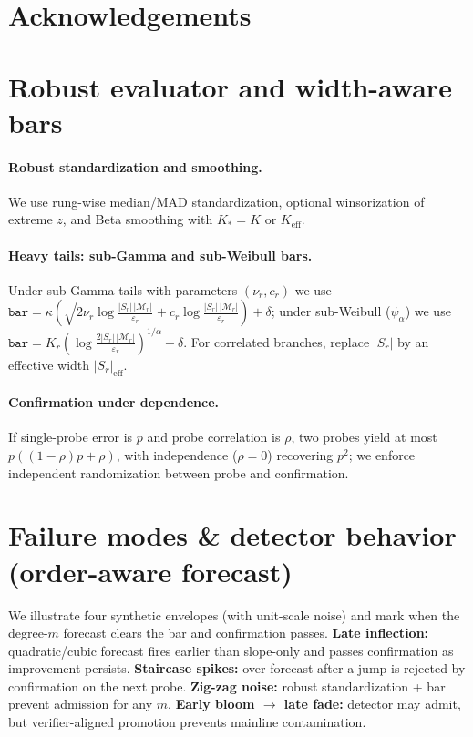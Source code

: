 \documentclass{article}
\begin{document}
\ificlrfinal
\section*{Acknowledgements}
\fi



\appendix

\section{Robust evaluator and width-aware bars}\label{app:robust-eval}
\paragraph{Robust standardization and smoothing.}
We use rung-wise median/MAD standardization, optional winsorization of extreme $z$, and Beta smoothing with $K_{*}{=}K$ or $K_{\mathrm{eff}}$.
\paragraph{Heavy tails: sub-Gamma and sub-Weibull bars.}
Under sub-Gamma tails with parameters $(\nu_r,c_r)$ we use
$\texttt{bar}=\kappa(\sqrt{2\nu_r\log \frac{|S_r|\,|\mathcal{M}_r|}{\varepsilon_r}}+c_r\log \frac{|S_r|\,|\mathcal{M}_r|}{\varepsilon_r})+\delta$;
under sub-Weibull ($\psi_\alpha$) we use $\texttt{bar}=K_r(\log \frac{2|S_r|\,|\mathcal{M}_r|}{\varepsilon_r})^{1/\alpha}+\delta$.
For correlated branches, replace $|S_r|$ by an effective width $|S_r|_{\mathrm{eff}}$.
\paragraph{Confirmation under dependence.} If single-probe error is $p$ and probe correlation is $\rho$, two probes yield at most $p((1-\rho)p+\rho)$,
with independence ($\rho\!=\!0$) recovering $p^2$; we enforce independent randomization between probe and confirmation.

\section{Failure modes \& detector behavior (order-aware forecast)}
We illustrate four synthetic envelopes (with unit-scale noise) and mark when the degree-$m$ forecast clears the bar and confirmation passes.
\textbf{Late inflection:} quadratic/cubic forecast fires earlier than slope-only and passes confirmation as improvement persists.
\textbf{Staircase spikes:} over-forecast after a jump is rejected by confirmation on the next probe.
\textbf{Zig-zag noise:} robust standardization + bar prevent admission for any $m$.
\textbf{Early bloom $\to$ late fade:} detector may admit, but verifier-aligned promotion prevents mainline contamination.
\end{document}

